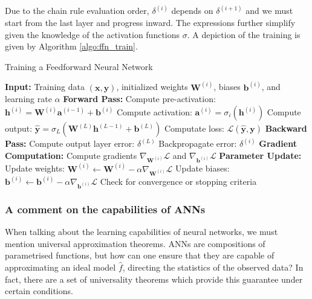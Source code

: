 Due to the chain rule evaluation order, $\delta^{(i)}$ depends on $\delta^{(i+1)}$ and we must start from the last layer and progress inward. The expressions further simplify given the knowledge of the activation functions $\sigma$. A depiction of the training is given by Algorithm \ref{algo:ffn_train}.

\begin{algorithm}[H]
    \caption{Training a Feedforward Neural Network}
    \begin{algorithmic} 
    \STATE \textbf{Input:} Training data $(\mathbf{x}, \mathbf{y})$, initialized weights $\mathbf{W}^{(i)}$, biases $\mathbf{b}^{(i)}$, and learning rate $\alpha$
        \STATE \textbf{Forward Pass:}
            \STATE Compute pre-activation: $\mathbf{h}^{(i)} = \mathbf{W}^{(i)} \mathbf{a}^{(i-1)} + \mathbf{b}^{(i)}$
            \STATE Compute activation: $\mathbf{a}^{(i)} = \sigma_i(\mathbf{h}^{(i)})$
        \ENDFOR
        \STATE Compute output: $\mathbf{\hat{y}} = \sigma_L(\mathbf{W}^{(L)} \mathbf{h}^{(L-1)} + \mathbf{b}^{(L)})$
        \STATE Computate loss: $\mathcal{L}(\mathbf{\hat{y}}, \mathbf{y})$
        \STATE \textbf{Backward Pass:}
        \STATE Compute output layer error: $\delta^{(L)}$
            \STATE Backpropagate error: $\delta^{(i)}$
        \ENDFOR
        \STATE \textbf{Gradient Computation:}
            \STATE Compute gradients $\nabla_{\mathbf{W}^{(i)}} \mathcal{L}$ and $\nabla_{\mathbf{b}^{(i)}} \mathcal{L}$
        \ENDFOR
        \STATE \textbf{Parameter Update:}
            \STATE Update weights: $\mathbf{W}^{(i)} \leftarrow \mathbf{W}^{(i)} - \alpha \nabla_{\mathbf{W}^{(i)}} \mathcal{L}$
            \STATE Update biases: $\mathbf{b}^{(i)} \leftarrow \mathbf{b}^{(i)} - \alpha \nabla_{\mathbf{b}^{(i)}} \mathcal{L}$
        \ENDFOR
        \STATE Check for convergence or stopping criteria
    \ENDFOR
\end{algorithmic}
\label{algo:ffn_train}
\end{algorithm}


\subsubsection{A comment on the capabilities of ANNs}

When talking about the learning capabilities of neural networks, we must mention universal approximation theorems. ANNs are compositions of parametrised functions, but how can one ensure that they are capable of approximating an ideal model $\hat{f}$, directing the statistics of the observed data? In fact, there are a set of universality theorems which provide this guarantee under certain conditions.

